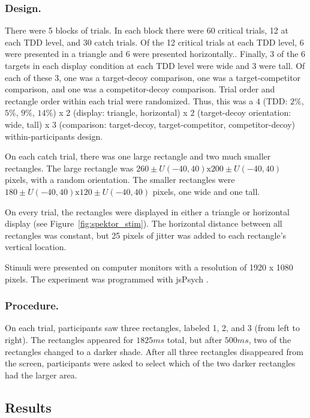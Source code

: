 \subsubsection{Design.}
There were 5 blocks of trials. In each block there were 60 critical trials, 12 at each TDD level, and 30 catch trials. Of the 12 critical trials at each TDD level, 6 were presented in a triangle and 6 were presented horizontally.. Finally, 3 of the 6 targets in each display condition at each TDD level were wide and 3 were tall. Of each of these 3, one was a target-decoy comparison, one was a target-competitor comparison, and one was a competitor-decoy comparison. Trial order and rectangle order within each trial were randomized. Thus, this was a $4$ (TDD: $2\%$, $5\%$, $9\%$, $14\%$) x $2$ (display: triangle, horizontal) x $2$ (target-decoy orientation: wide, tall) x $3$ (comparison: target-decoy, target-competitor, competitor-decoy) within-participants design. 

On each catch trial, there was one large rectangle and two much smaller rectangles. The large rectangle was $260 \pm U(-40, 40) \text{x} 200 \pm U(-40, 40)$ pixels, with a random orientation. The smaller rectangles were $180 \pm U(-40, 40) \text{x} 120 \pm U(-40, 40)$ pixels, one wide and one tall.

On every trial, the rectangles were displayed in either a triangle or horizontal display (see Figure~\ref{fig:spektor_stim}). The horizontal distance between all rectangles was constant, but 25 pixels of jitter was added to each rectangle's vertical location.

Stimuli were presented on computer monitors with a resolution of 1920 x 1080 pixels. The experiment was programmed with jsPsych \parencite{deleeuwJsPsychJavaScriptLibrary2015}. 

\subsubsection{Procedure.}
On each trial, participants saw three rectangles, labeled 1, 2, and 3 (from left to right). The rectangles appeared for $1825ms$ total, but after $500ms$, two of the rectangles changed to a darker shade. After all three rectangles disappeared from the screen, participants were asked to select which of the two darker rectangles had the larger area.

\subsection{Results}

